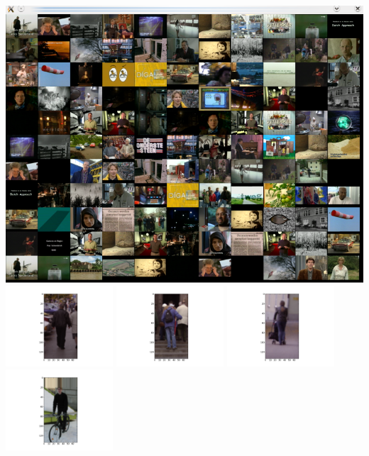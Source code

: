 \documentclass{report}
\begin{document}
\includegraphics[width=\textwidth]{121videos.png}
\clearpage%
\includegraphics[width=4cm]{dbshow-0-0.png}
\clearpage%
\includegraphics[width=4cm]{dbshow-0-1.png}
\clearpage%
\includegraphics[width=4cm]{dbshow-0-2.png}
\clearpage%
\includegraphics[width=4cm]{dbshow-0-3.png}
\end{document}
